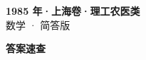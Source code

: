 \documentclass[zihao=-4, a4paper]{ctexart}
\begin{document}
\begin{center}
  {\Large\bfseries 1985 年·上海卷·理工农医类}\\[4pt]
  {\large 数学 · 简答版}
\end{center}
\medskip
{}

\clearpage
{}
\begin{center}{\Large\bfseries 答案速查}\end{center}
\medskip

\end{document}
